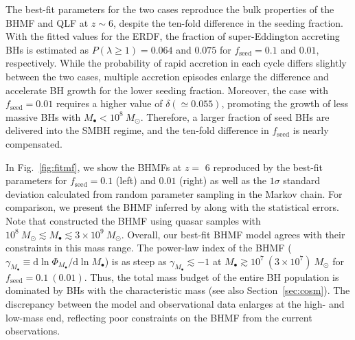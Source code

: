 \documentclass[twocolumn, twocolappendix]{aastex63}
\newcommand{\Msun}{M_\odot}
\newcommand{\Mbh}{M_\bullet}
\newcommand{\fseed}{f_\mathrm{seed}}
\newcommand{\D}{\mathrm{d}}
\begin{document}
\begin{CJK*}{UTF8}{gbsn}
The best-fit parameters for the two cases reproduce the bulk properties of the BHMF and QLF at $z\sim 6$,
despite the ten-fold difference in the seeding fraction.
With the fitted values for the ERDF, the fraction of super-Eddington accreting BHs is estimated as 
$P(\lambda \geq 1)=0.064$ and $0.075$ for $\fseed=0.1$ and $0.01$, respectively.
While the probability of rapid accretion in each cycle differs slightly between the two cases,
multiple accretion episodes enlarge the difference and accelerate BH growth for the lower seeding fraction.
Moreover, the case with $\fseed=0.01$ requires a higher value of $\delta (\simeq 0.055)$,
promoting the growth of less massive BHs with $M_\bullet <10^8~\Msun$.
Therefore, a larger fraction of seed BHs are delivered into the SMBH regime,
and the ten-fold difference in $\fseed$ is nearly compensated.






In Fig.~\ref{fig:fitmf}, we show the BHMFs at $z=$ 6 reproduced by the best-fit parameters for 
$\fseed = 0.1$ (left) and $0.01$ (right) as well as
the $1\sigma$ standard deviation calculated from random parameter sampling in the Markov chain.
For comparison, we present the BHMF inferred by  along with the statistical errors.
Note that  constructed the BHMF using quasar samples with 
$10^8~\Msun \lesssim \Mbh \lesssim 3\times 10^9~\Msun$.
Overall, our best-fit BHMF model agrees with their constraints in this mass range.
The power-law index of the BHMF ($\gamma_{M_\bullet} \equiv \D \ln \Phi_{M_\bullet}/\D \ln M_\bullet$) is as steep as $\gamma_{M_\bullet}\lesssim -1$
at $M_\bullet \gtrsim 10^7~(3\times 10^7)~\Msun$ for $\fseed = 0.1 ~(0.01)$.
Thus, the total mass budget of the entire BH population is dominated by BHs with the characteristic mass (see also Section~\ref{sec:cosm}). 
The discrepancy between the model and observational data enlarges at the high- and low-mass end,
reflecting poor constraints on the BHMF from the current observations.



\end{CJK*}
\end{document}
